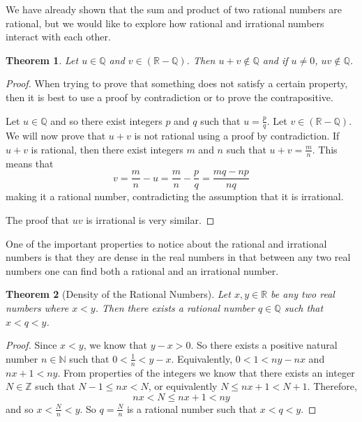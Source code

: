 \documentclass[
]{book}
\newtheorem{theorem}{Theorem}[chapter]
\theoremstyle{definition}
\theoremstyle{definition}
\theoremstyle{definition}
\theoremstyle{remark}
\begin{document}
We have already shown that the sum and product of two rational numbers are rational, but we would like to explore how rational and irrational numbers interact with each other.

\begin{theorem}
\protect\hypertarget{thm:unnamed-chunk-113}{}{\label{thm:unnamed-chunk-113} }Let \(u\in \mathbb{Q}\) and \(v\in (\mathbb{R}-\mathbb{Q})\). Then \(u+v\notin \mathbb{Q}\) and if \(u\neq 0\), \(uv\notin \mathbb{Q}\).
\end{theorem}

\begin{proof}
{}When trying to prove that something does not satisfy a certain property, then it is best to use a proof by contradiction or to prove the contrapositive.

Let \(u\in \mathbb{Q}\) and so there exist integers \(p\) and \(q\) such that \(u=\frac{p}{q}\). Let \(v\in (\mathbb{R}-\mathbb{Q})\). We will now prove that \(u+v\) is not rational using a proof by contradiction. If \(u+v\) is rational, then there exist integers \(m\) and \(n\) such that \(u+v=\frac{m}{n}\). This means that \[v= \frac{m}{n}-u = \frac{m}{n}-\frac{p}{q} = \frac{mq-np}{nq}\] making it a rational number, contradicting the assumption that it is irrational.

The proof that \(uv\) is irrational is very similar.
\end{proof}

One of the important properties to notice about the rational and irrational numbers is that they are dense in the real numbers in that between any two real numbers one can find both a rational and an irrational number.

\begin{theorem}[Density of the Rational Numbers]
\protect\hypertarget{thm:unnamed-chunk-115}{}{\label{thm:unnamed-chunk-115} {} }Let \(x,y\in \mathbb{R}\) be any two real numbers where \(x<y\). Then there exists a rational number \(q\in \mathbb{Q}\) such that \(x<q<y\).
\end{theorem}

\begin{proof}
{}Since \(x<y\), we know that \(y-x>0\). So there exists a positive natural number \(n\in \mathbb{N}\) such that \(0<\frac{1}{n}<y-x\). Equivalently, \(0<1<ny-nx\) and \(nx+1<ny\). From properties of the integers we know that there exists an integer \(N\in \mathbb{Z}\) such that \(N-1\leq nx<N\), or equivalently \(N\leq nx+1 < N+1\). Therefore, \[nx<N\leq nx+1 < ny\] and so \(x<\frac{N}{n} <y\). So \(q=\frac{N}{n}\) is a rational number such that \(x<q<y\).
\end{proof}
\end{document}
